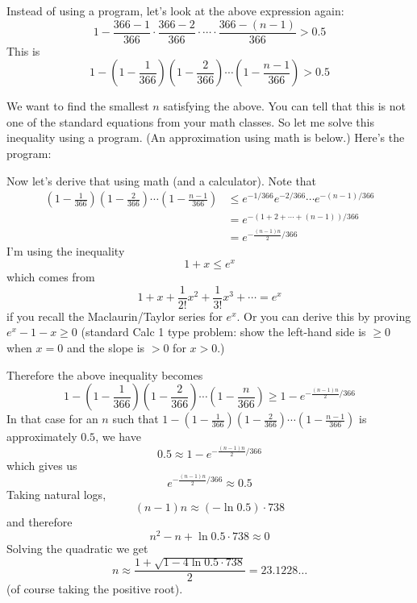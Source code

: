 Instead of using a program, let's look at the above expression again:
\[
1 - \frac{366 - 1}{366} \cdot 
\frac{366 - 2}{366} \cdot \cdots \cdot
\frac{366 - (n - 1)}{366} > 0.5
\]
This is
\[
1 - 
\left( 1 - \frac{1}{366} \right)  
\left( 1 - \frac{2}{366} \right)  
\cdots 
\left( 1 - \frac{n - 1}{366} \right)
> 0.5  
\]

We want to find the smallest $n$ satisfying the above.
You can tell that this is not one of the standard equations
from your math classes.
So let me solve this inequality using a program.
(An approximation using math is below.)
Here's the program:

  
Now let's derive that using math (and a calculator).
Note that
\begin{align*}
\left( 1 - \frac{1}{366} \right)  
\left( 1 - \frac{2}{366} \right)  
\cdots 
\left( 1 - \frac{n - 1}{366} \right)  
&\leq e^{-1/366} e^{-2/366} \cdots e^{-(n - 1)/366} \\
&= e^{-(1 + 2 + \cdots + (n - 1))/366} \\
&= e^{-\frac{(n - 1)n}{2}/366} 
\end{align*}
I'm using the inequality
\[
1 + x \leq e^x
\]
which comes from
\[
1 + x + \frac{1}{2!}x^2 + \frac{1}{3!}x^3 + \cdots = e^x
\]
if you recall the Maclaurin/Taylor series for $e^x$.
Or you can derive this by proving $e^x - 1 - x \geq 0$
(standard Calc 1 type problem: show the left-hand side is $ \geq 0$
when $x = 0$ and the slope is $> 0$ for $x > 0$.)

Therefore the above inequality becomes
\[
1 - 
\left( 1 - \frac{1}{366} \right)  
\left( 1 - \frac{2}{366} \right)  
\cdots 
\left( 1 - \frac{n}{366} \right)
\geq 1 - e^{-\frac{(n-1)n}{2}/366}
\]
In that case for an $n$ such that
$1 - \left( 1 - \frac{1}{366} \right)  
\left( 1 - \frac{2}{366} \right)  
\cdots 
\left( 1 - \frac{n - 1}{366} \right)$
is approximately $0.5$,
we have
\[
0.5 \approx 1 - e^{-\frac{(n-1)n}{2}/366}
\]
which gives us
\[
e^{-\frac{(n-1)n}{2}/366} \approx 0.5
\]
Taking natural logs,
\[
(n-1)n \approx (-\ln 0.5) \cdot 738
\]
and therefore
\[
n^2 - n + \ln 0.5 \cdot 738 \approx 0
\]
Solving the quadratic we get
\[
n \approx \frac{1 + \sqrt{1 - 4 \ln 0.5 \cdot 738}}{2} = 23.1228\ldots
\]
(of course taking the positive root).

